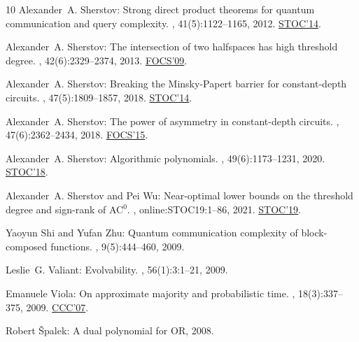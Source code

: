 \documentclass[11pt]{article}
\numberwithin{equation}{section}
\theoremstyle{definition}
\theoremstyle{plain}
\begin{document}
\begin{thebibliography}{10}
{\sc Alexander~A. Sherstov}: Strong direct product theorems for quantum
  communication and query complexity.
, 41(5):1122--1165, 2012.
\newblock \prelim \href{https://doi.org/10.1145/1993636.1993643}{STOC'14}.
\newblock [\epfmtdoi{10.1137/110842661}]

{\sc Alexander~A. Sherstov}: The intersection of two halfspaces has high
  threshold degree.
, 42(6):2329--2374, 2013.
\newblock \prelim \href{https://doi.org/10.1109/FOCS.2009.18}{FOCS'09}.
\newblock [\epfmtdoi{10.1137/100785260}]

{\sc Alexander~A. Sherstov}: Breaking the {M}insky-{P}apert barrier for
  constant-depth circuits.
, 47(5):1809--1857, 2018.
\newblock \prelim \href{https://doi.org/10.1145/2591796.2591871}{STOC'14}.
\newblock [\epfmtdoi{10.1137/15M1015704}]

{\sc Alexander~A. Sherstov}: The power of asymmetry in constant-depth circuits.
, 47(6):2362--2434, 2018.
\newblock \prelim \href{https://doi.org/10.1109/FOCS.2015.34}{FOCS'15}.
\newblock [\epfmtdoi{10.1137/100785260}]

{\sc Alexander~A. Sherstov}: Algorithmic polynomials.
, 49(6):1173--1231, 2020.
\newblock \prelim \href{https://doi.org/10.1145/3188745.3188958}{STOC'18}.

{\sc Alexander~A. Sherstov and Pei Wu}: Near-optimal lower bounds on the
  threshold degree and sign-rank of {AC}$^0$.
, online:STOC19:1--86, 2021.
\newblock \prelim \href{https://doi.org/10.1145/3313276.3316408}{STOC'19}.

{\sc Yaoyun Shi and Yufan Zhu}: Quantum communication complexity of
  block-composed functions.
, 9(5):444--460, 2009.

{\sc Leslie~G. Valiant}: Evolvability.
, 56(1):3:1--21, 2009.
\newblock [\epfmtdoi{10.1145/1462153.1462156}]

{\sc Emanuele Viola}: On approximate majority and probabilistic time.
, 18(3):337--375, 2009.
\newblock \prelim \href{https://doi.org/10.1109/CCC.2007.16}{CCC'07}.
\newblock [\epfmtdoi{10.1007/s00037-009-0267-3}]

{\sc Robert \v{S}palek}: A dual polynomial for {OR}, 2008.

\end{thebibliography}
\end{document}
